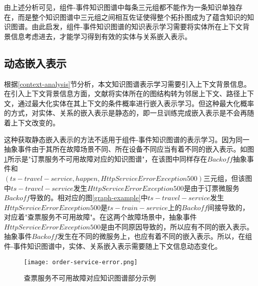 由上述分析可见，组件-事件知识图谱中每条三元组都不能作为一条知识单独存在，而是整个知识图谱中三元组之间相互佐证使得整个拓扑图成为了蕴含知识的知识图谱。由此启发，组件-事件知识图谱的知识表示学习需要将实体所在上下文背景信息考虑进去，才能学习得到有效的实体与关系嵌入表示。
\subsection{动态嵌入表示}
根据\ref{context-analysis}节分析，本文知识图谱表示学习需要引入上下文背景信息。在引入上下文背景信息方面，文献\parencite{feng2016gake,shi2017knowledge}将实体所在的图结构转为邻居上下文、路径上下文，通过最大化实体在其上下文的条件概率进行嵌入表示学习。但这种最大化概率的方式，对实体、关系的嵌入表示是静态的，即一旦训练完成嵌入表示是不会再随着上下文改变的。

这种获取静态嵌入表示的方法不适用于组件-事件知识图谱的表示学习。因为同一抽象事件由于其所在故障场景不同、所在设备不同应当有着不同的嵌入表示。如图\ref{order-service-error}所示是"订票服务不可用故障对应的知识图谱"，在该图中同样存在$Backoff$抽象事件和\\$\left(ts-travel-service, happen, HttpServiceError Exception 500\right)$三元组，但该图中$ts-travel-service$发生$HttpServiceError Exception 500$是由于订票微服务$Backoff$导致的。相对应的图\ref{graph-example}中$ts-travel-service$发生$HttpServiceError Exception 500$是$ts-train-service$上的$Backoff$间接导致的，对应着"查票服务不可用故障"。在这两个故障场景中，抽象事件$HttpServiceError Exception 500$是由不同原因导致的，所以应有不同的嵌入表示。抽象事件$Backoff$发生在不同的微服务上，也应有着不同的嵌入表示。所以，在组件-事件知识图谱中，实体、关系嵌入表示需要随上下文信息动态变化。
\begin{figure}[htbp]
    \centering
    \texttt{[image: order-service-error.png]}
    \caption{查票服务不可用故障对应知识图谱部分示例\label{order-service-error}}
\end{figure}

